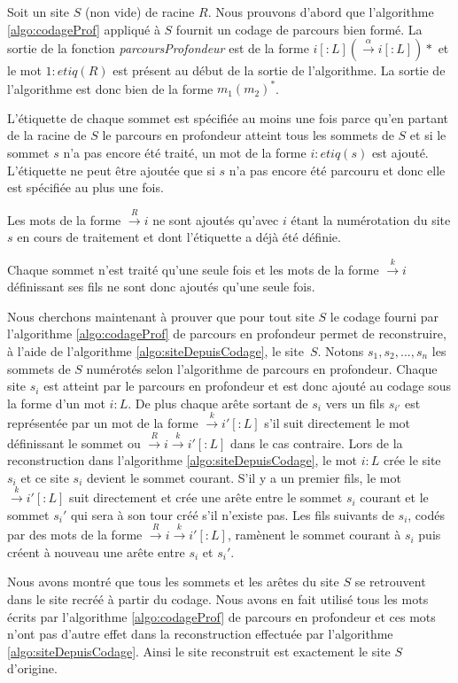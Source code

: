 \begin{pr}
 Soit un site $S$ (non vide) de racine $R$.
 Nous prouvons d'abord que l'algorithme \ref{algo:codageProf} appliqué à $S$ fournit un codage de parcours bien formé.
 La sortie de la fonction \emph{parcoursProfondeur} est de la forme $i[:L](\xrightarrow{\alpha}i[:L])*$ et le mot $1:etiq(R)$ est présent au début de la sortie de l'algorithme. La sortie de l'algorithme est donc bien de la forme $m_1(m_2)^*$.
 
 L'étiquette de chaque sommet est spécifiée au moins une fois parce qu'en partant de la racine de $S$ le parcours en profondeur atteint tous les sommets de $S$ et si le sommet $s$ n'a pas encore été traité, un mot de la forme $i:etiq(s)$ est ajouté. L'étiquette ne peut être ajoutée que si $s$ n'a pas encore été parcouru et donc elle est spécifiée au plus une fois.
 
 Les mots de la forme $\xrightarrow{R}i$ ne sont ajoutés qu'avec $i$ étant la numérotation du site $s$ en cours de traitement et dont l'étiquette a déjà été définie.
 
 Chaque sommet n'est traité qu'une seule fois et les mots de la forme $\xrightarrow{k}i$ définissant ses fils ne sont donc ajoutés qu'une seule fois.
 
 Nous cherchons maintenant à prouver que pour tout site $S$ le codage fourni par l'algorithme \ref{algo:codageProf} de parcours en profondeur permet de reconstruire, à l'aide de l'algorithme \ref{algo:siteDepuisCodage}, le site~$S$.
 Notons $s_1, s_2, ..., s_n$ les sommets de $S$ numérotés selon l'algorithme de parcours en profondeur. 
 Chaque site $s_i$ est atteint par le parcours en profondeur et est donc ajouté au codage sous la forme d'un mot $i:L$. 
 De plus chaque arête sortant de $s_i$ vers un fils $s_{i'}$ est représentée par un mot de la forme $\xrightarrow{k}i'[:L]$ s'il suit directement le mot définissant le sommet ou $\xrightarrow{R}i\xrightarrow{k}i'[:L]$ dans le cas contraire.
 Lors de la reconstruction dans l'algorithme \ref{algo:siteDepuisCodage}, le mot $i:L$ crée le site $s_i$ et ce site $s_i$ devient le sommet courant. S'il y a un premier fils, le mot $\xrightarrow{k}i'[:L]$ suit directement et crée une arête entre le sommet $s_i$
 courant et le sommet $s_i'$ qui sera à son tour créé s'il n'existe pas. Les fils suivants de $s_i$, codés par des mots de la forme $\xrightarrow{R}i\xrightarrow{k}i'[:L]$, ramènent le sommet courant à $s_i$ puis créent à nouveau une arête entre $s_i$ et $s_i'$.
 
 Nous avons montré que tous les sommets et les arêtes du site $S$ se retrouvent dans le site recréé à partir du codage.
 Nous avons en fait utilisé tous les mots écrits par l'algorithme \ref{algo:codageProf} de parcours en profondeur et ces mots n'ont pas d'autre effet dans la reconstruction effectuée par l'algorithme \ref{algo:siteDepuisCodage}.
 Ainsi le site reconstruit est exactement le site $S$ d'origine. 
\end{pr}

